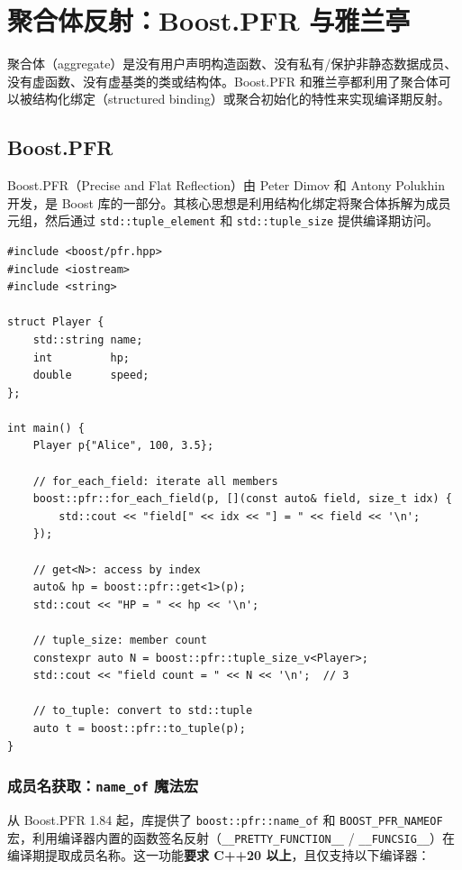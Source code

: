 \documentclass[12pt,a4paper,fontset=fandol]{ctexbook}
\begin{document}
\section{聚合体反射：Boost.PFR 与雅兰亭}\label{sec:aggregate}

聚合体（aggregate）是没有用户声明构造函数、没有私有/保护非静态数据成员、没有虚函数、没有虚基类的类或结构体。Boost.PFR 和雅兰亭都利用了聚合体可以被结构化绑定（structured binding）或聚合初始化的特性来实现编译期反射。

\subsection{Boost.PFR}\label{subsec:pfr}

Boost.PFR（Precise and Flat Reflection）由 Peter Dimov 和 Antony Polukhin 开发，是 Boost 库的一部分。其核心思想是利用结构化绑定将聚合体拆解为成员元组，然后通过 \texttt{std::tuple\_element} 和 \texttt{std::tuple\_size} 提供编译期访问。

\begin{lstlisting}[caption={Boost.PFR: 遍历聚合体成员}]
#include <boost/pfr.hpp>
#include <iostream>
#include <string>

struct Player {
    std::string name;
    int         hp;
    double      speed;
};

int main() {
    Player p{"Alice", 100, 3.5};

    // for_each_field: iterate all members
    boost::pfr::for_each_field(p, [](const auto& field, size_t idx) {
        std::cout << "field[" << idx << "] = " << field << '\n';
    });

    // get<N>: access by index
    auto& hp = boost::pfr::get<1>(p);
    std::cout << "HP = " << hp << '\n';

    // tuple_size: member count
    constexpr auto N = boost::pfr::tuple_size_v<Player>;
    std::cout << "field count = " << N << '\n';  // 3

    // to_tuple: convert to std::tuple
    auto t = boost::pfr::to_tuple(p);
}
\end{lstlisting}

\subsubsection*{成员名获取：\texttt{name\_of} 魔法宏}

从 Boost.PFR 1.84 起，库提供了 \texttt{boost::pfr::name\_of} 和 \texttt{BOOST\_PFR\_NAMEOF} 宏，利用编译器内置的函数签名反射（\texttt{\_\_PRETTY\_FUNCTION\_\_} / \texttt{\_\_FUNCSIG\_\_}）在编译期提取成员名称。这一功能\textbf{要求 C++20 以上}，且仅支持以下编译器：
\end{document}

